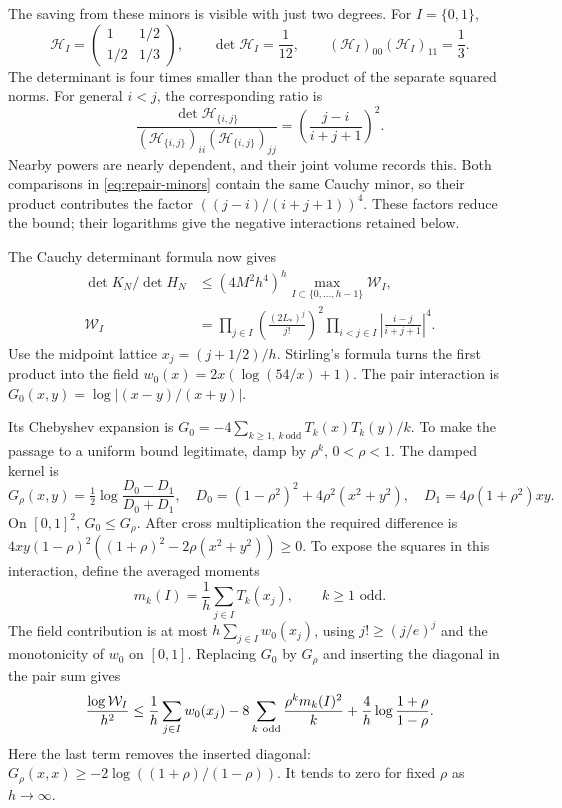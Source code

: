 The saving from these minors is visible with just two degrees. For
$I=\{0,1\}$,
\[
 \mathcal H_I=\begin{pmatrix}1&1/2\\1/2&1/3\end{pmatrix},\qquad
 \det\mathcal H_I=\frac1{12},\qquad
 (\mathcal H_I)_{00}(\mathcal H_I)_{11}=\frac13.
\]
The determinant is four times smaller than the product of the separate
squared norms. For general $i<j$, the corresponding ratio is
\[
 \frac{\det\mathcal H_{\{i,j\}}}
      {(\mathcal H_{\{i,j\}})_{ii}(\mathcal H_{\{i,j\}})_{jj}}
       =\left(\frac{j-i}{i+j+1}\right)^2.
\]
Nearby powers are nearly dependent, and their joint volume records this.
Both comparisons in \eqref{eq:repair-minors} contain the same Cauchy
minor, so their product contributes the factor
$((j-i)/(i+j+1))^4$. These factors reduce the bound; their logarithms
give the negative interactions retained below.

The Cauchy determinant formula now gives
\begin{align*}
 \det K_N/\det H_N&\le(4M^2h^4)^h\max_{I\subset\{0,\ldots,h-1\}}\mathcal W_I,\\
 \mathcal W_I&=\prod_{j\in I}\left(\frac{(2L_*)^j}{j!}\right)^2
     \prod_{i<j\in I}\left|\frac{i-j}{i+j+1}\right|^4.
\end{align*}
Use the midpoint lattice $x_j=(j+1/2)/h$. Stirling's formula turns
the first product into the field
$w_0(x)=2x(\log(54/x)+1)$. The pair interaction is
$G_0(x,y)=\log|(x-y)/(x+y)|$.

Its Chebyshev expansion is
$G_0=-4\sum_{k\ge1,\ k\ \mathrm{odd}}T_k(x)T_k(y)/k$.
To make the passage to a uniform bound legitimate, damp by $\rho^k$,
$0<\rho<1$. The damped kernel is
\[
 G_\rho(x,y)=\tfrac12\log\frac{D_0-D_1}{D_0+D_1},\quad
 D_0=(1-\rho^2)^2+4\rho^2(x^2+y^2),\quad
 D_1=4\rho(1+\rho^2)xy.
\]
On $[0,1]^2$, $G_0\le G_\rho$. After cross multiplication the
required difference is
$4xy(1-\rho)^2((1+\rho)^2-2\rho(x^2+y^2))\ge0$.
To expose the squares in this interaction, define the averaged moments
\[
 m_k(I)=\frac1h\sum_{j\in I}T_k(x_j),\qquad k\ge1\text{ odd}.
\]
The field contribution is at most $h\sum_{j\in I}w_0(x_j)$, using
$j!\ge(j/e)^j$ and the monotonicity of $w_0$ on $[0,1]$.
Replacing $G_0$ by $G_\rho$ and inserting the diagonal in the pair
sum gives
\[
 \frac{\log\mathcal W_I}{h^2}
 \le\frac1h\sum_{j\in I}w_0(x_j)
       -8\sum_{k\ {\rm odd}}\frac{\rho^km_k(I)^2}{k}
       +\frac4h\log\frac{1+\rho}{1-\rho}.
\]
Here the last term removes the inserted diagonal:
$G_\rho(x,x)\ge-2\log((1+\rho)/(1-\rho))$.
It tends to zero for fixed $\rho$ as $h\to\infty$.

